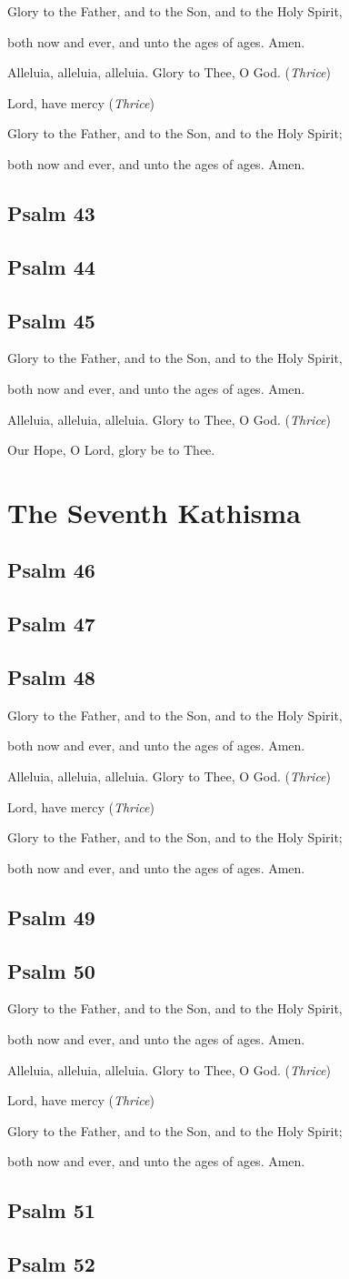 \documentclass[12pt,openany]{book}
\newcommand{\kathismabreak}{
  \medskip
  \begin{center}
  \begin{footnotesize}
  Glory to the Father, and to the Son, and to the Holy Spirit,
  
  both now and ever, and unto the ages of ages. Amen.

  Alleluia, alleluia, alleluia. Glory to Thee, O God. (\textit{Thrice})

  Lord, have mercy (\textit{Thrice})

  Glory to the Father, and to the Son, and to the Holy Spirit;
  
  both now and ever, and unto the ages of ages. Amen.
  \end{footnotesize}
  \end{center}
  \smallbreak
}
\newcommand{\kathismaend}{
  \medskip
  \begin{center}
  \begin{footnotesize}
  Glory to the Father, and to the Son, and to the Holy Spirit,
  
  both now and ever, and unto the ages of ages. Amen.

  Alleluia, alleluia, alleluia. Glory to Thee, O God. (\textit{Thrice})

  Our Hope, O Lord, glory be to Thee.
  \end{footnotesize}
  \end{center}
  \smallbreak
}
\begin{document}
\kathismabreak
\smallskip
\section{Psalm 43}

\smallskip
\section{Psalm 44}

\smallskip
\section{Psalm 45}


\kathismaend

\chapter*{The Seventh Kathisma}
\smallskip
\section{Psalm 46}

\smallskip
\section{Psalm 47}

\smallskip
\section{Psalm 48}


\kathismabreak
\bigskip
\section{Psalm 49}

\smallskip
\pagebreak %
\section{Psalm 50}


\kathismabreak
\section{Psalm 51}

\section{Psalm 52}

\end{document}
